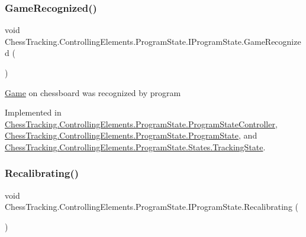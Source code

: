 \subsubsection{\texorpdfstring{GameRecognized()}{GameRecognized()}}
{\footnotesize\ttfamily void Chess\+Tracking.\+Controlling\+Elements.\+Program\+State.\+I\+Program\+State.\+Game\+Recognized (\begin{DoxyParamCaption}{ }\end{DoxyParamCaption})}



\mbox{\hyperlink{namespace_chess_tracking_1_1_game}{Game}} on chessboard was recognized by program 



Implemented in \mbox{\hyperlink{class_chess_tracking_1_1_controlling_elements_1_1_program_state_1_1_program_state_controller_af3085a452edced63dca39e16da3459c7}{Chess\+Tracking.\+Controlling\+Elements.\+Program\+State.\+Program\+State\+Controller}}, \mbox{\hyperlink{class_chess_tracking_1_1_controlling_elements_1_1_program_state_1_1_program_state_a5361b01f2091526a01550fa927735889}{Chess\+Tracking.\+Controlling\+Elements.\+Program\+State.\+Program\+State}}, and \mbox{\hyperlink{class_chess_tracking_1_1_controlling_elements_1_1_program_state_1_1_states_1_1_tracking_state_a36f3273295b31a2c88c7ed5c35778460}{Chess\+Tracking.\+Controlling\+Elements.\+Program\+State.\+States.\+Tracking\+State}}.

\mbox{\label{interface_chess_tracking_1_1_controlling_elements_1_1_program_state_1_1_i_program_state_ab429b32115bb96d9a91e3966c12096a9}} 
\subsubsection{\texorpdfstring{Recalibrating()}{Recalibrating()}}
{\footnotesize\ttfamily void Chess\+Tracking.\+Controlling\+Elements.\+Program\+State.\+I\+Program\+State.\+Recalibrating (\begin{DoxyParamCaption}{ }\end{DoxyParamCaption})}




